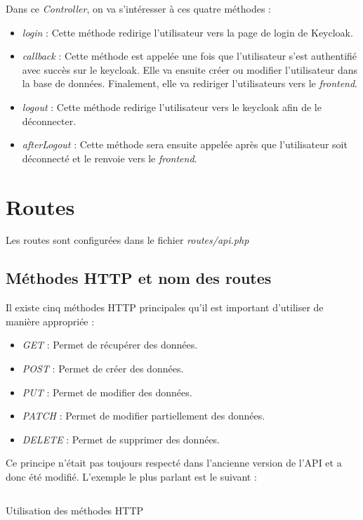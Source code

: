 Dans ce \emph{Controller}, on va s'intéresser à ces quatre méthodes :
\begin{itemize}
    \item \emph{login} : Cette méthode redirige l'utilisateur vers la page de login de Keycloak.
    \item \emph{callback} : Cette méthode est appelée une fois que l'utilisateur s'est authentifié avec succès sur le keycloak. Elle va ensuite créer ou modifier l'utilisateur dans la base de données. Finalement, elle va rediriger l'utilisateurs vers le \emph{frontend}.
    \item \emph{logout} : Cette méthode redirige l'utilisateur vers le keycloak afin de le déconnecter.
    \item \emph{afterLogout} : Cette méthode sera ensuite appelée après que l'utilisateur soit déconnecté et le renvoie vers le \emph{frontend}.
\end{itemize}

\section{Routes}
Les routes sont configurées dans le fichier \emph{routes/api.php}
\subsection{Méthodes HTTP et nom des routes}
Il existe cinq méthodes HTTP principales qu'il est important d'utiliser de manière appropriée :
\begin{itemize}
    \item \emph{GET} : Permet de récupérer des données.
    \item \emph{POST} : Permet de créer des données.
    \item \emph{PUT} : Permet de modifier des données.
    \item \emph{PATCH} : Permet de modifier partiellement des données.
    \item \emph{DELETE} : Permet de supprimer des données.
\end{itemize}

Ce principe n'était pas toujours respecté dans l'ancienne version de l'API et a donc été modifié. L'exemple le plus parlant est le suivant :

\begin{listing}[H]
    \inputminted{php}{assets/code/routesMethod.php}
    \caption{Utilisation des méthodes HTTP}
\end{listing}

